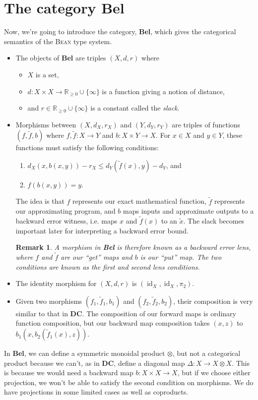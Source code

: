 \documentclass[a4paper]{article}
\newcommand{\DC}{\textbf{DC}}
\newcommand{\Bel}{\textbf{Bel}}
\newcommand{\Bean}{\textsc{Bean}}
\newcommand{\R}{\mathbb{R}}
\DeclareMathOperator{\id}{id}
\newtheorem{remark}{Remark}
\begin{document}
\section{The category \Bel{}}
Now, we're going to introduce the category, \Bel{}, which gives the categorical semantics of the \Bean{} type system. 
\begin{itemize}
    \item The objects of \Bel{} are triples $(X, d,r)$ where
    \begin{itemize}
        \item $X$ is a set,
        \item $d:X\times X\to \R_{\geq 0}\cup\{\infty\}$ is a function giving a notion of distance,
        \item and $r\in\R_{\geq 0}\cup\{\infty\}$ is a constant called the \emph{slack}. 
    \end{itemize}
    \item Morphisms between $(X,d_X,r_X)$ and $(Y,d_Y,r_Y)$ are triples of functions $(f,\tilde{f},b)$ where $f,\tilde{f}:X\to Y$ and $b:X\times Y\to X$. For $x\in X$ and $y\in Y$, these functions must satisfy the following conditions:
    \begin{enumerate}
        \item $d_X(x,b(x,y))-r_X\leq d_Y(\tilde{f}(x),y)-d_Y$, and
        \item $f(b(x,y))=y$.
    \end{enumerate}
    The idea is that $f$ represents our exact mathematical function, $\tilde{f}$ represents our approximating program, and $b$ maps inputs and approximate outputs to a backward error witness, i.e. maps $x$ and $\tilde{f}(x)$ to an $\tilde{x}$. The slack becomes important later for interpreting a backward error bound. 
    \begin{remark}
        A morphism in \Bel{} is therefore known as a \emph{backward error lens}, where $f$ and $\tilde{f}$ are our ``get'' maps and $b$ is our ``put'' map. The two conditions are known as the first and second lens conditions.
    \end{remark}
    \item The identity morphism for $(X,d,r)$ is $(\id_X,\id_X,\pi_2)$.
    \item Given two morphisms $(f_1,\tilde{f}_1,b_1)$ and $(f_2,\tilde{f}_2,b_2)$, their composition is very similar to that in \DC{}. The composition of our forward maps is ordinary function composition, but our backward map composition takes $(x,z)$ to $b_1(x,b_2(\tilde{f}_1(x),z))$.
\end{itemize}
In \Bel{}, we can define a symmetric monoidal product $\otimes$, but not a categorical product because we can't, as in \DC{}, define a diagonal map $\Delta:X\to X\otimes X$. This is because we would need a backward map $b:X\times X\to X$, but if we choose either projection, we won't be able to satisfy the second condition on morphisms. We do have projections in some limited cases as well as coproducts.
\end{document}
